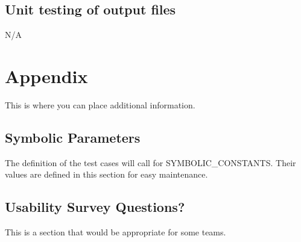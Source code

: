 \documentclass[12pt, titlepage]{article}
\begin{document}
\subsection{Unit testing of output files}		

N/A





\newpage

\section{Appendix}

This is where you can place additional information.

\subsection{Symbolic Parameters}

The definition of the test cases will call for SYMBOLIC\_CONSTANTS.
Their values are defined in this section for easy maintenance.

\subsection{Usability Survey Questions?}

This is a section that would be appropriate for some teams.
\end{document}
